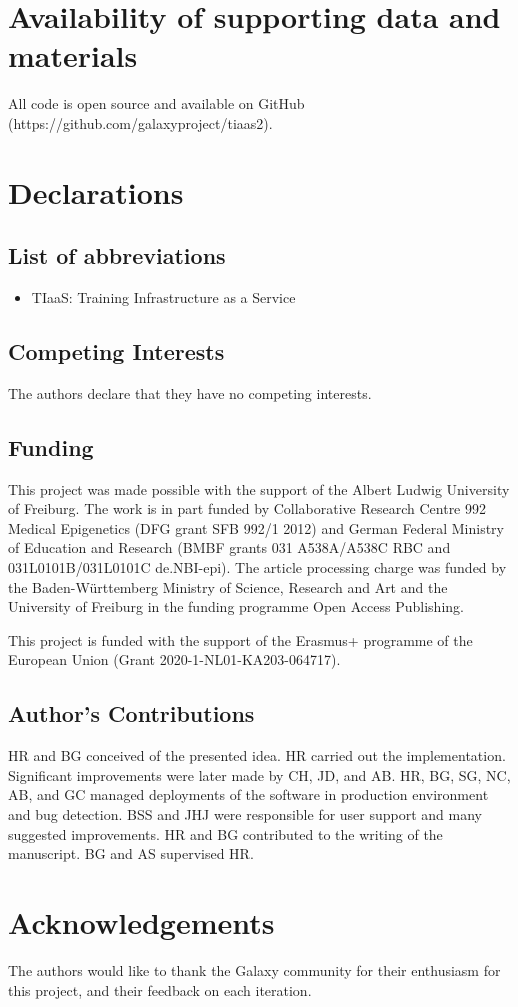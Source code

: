 \documentclass[a4paper,num-refs]{oup-contemporary}
\begin{document}
\section{Availability of supporting data and materials}
All code is open source and available on GitHub (https://github.com/galaxyproject/tiaas2).

\section{Declarations}

\subsection{List of abbreviations}
\begin{itemize}
\item TIaaS: Training Infrastructure as a Service
\end{itemize}


\subsection{Competing Interests}
The authors declare that they have no competing interests.

\subsection{Funding}
This project was made possible with the support of the Albert Ludwig University of Freiburg.
The work is in part funded by Collaborative Research Centre 992 Medical Epigenetics (DFG grant SFB 992/1 2012) and German Federal Ministry of Education and Research (BMBF grants 031 A538A/A538C RBC and 031L0101B/031L0101C de.NBI-epi). The article processing charge was funded by the Baden-Württemberg Ministry of Science, Research and Art and the University of Freiburg in the funding programme Open Access Publishing.

This project is funded with the support of the Erasmus+ programme of the European Union (Grant 2020-1-NL01-KA203-064717).

\subsection{Author's Contributions}
HR and BG conceived of the presented idea. HR carried out the implementation. Significant improvements were later made by CH, JD, and AB. HR, BG, SG, NC, AB, and GC managed deployments of the software in production environment and bug detection. BSS and JHJ were responsible for user support and many suggested improvements. HR and BG contributed to the writing of the manuscript. BG and AS supervised HR.

\section{Acknowledgements}
The authors would like to thank the Galaxy community for their enthusiasm for this project, and their feedback on each iteration.


\end{document}
